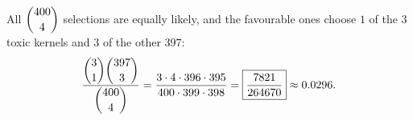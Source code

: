 All $\dbinom{400}4$ selections are equally likely, and the favourable ones choose $1$ of the $3$ toxic kernels and $3$ of the other $397$:
\[\dfrac{\dbinom31\dbinom{397}3}{\dbinom{400}4}=\dfrac{3\cdot4\cdot396\cdot395}{400\cdot399\cdot398}=\boxed{\dfrac{7821}{264670}}\approx0.0296.\]
